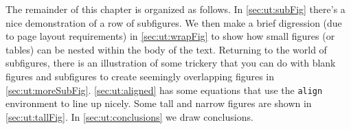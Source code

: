 The remainder of this chapter is organized as follows.
In \autoref{sec:ut:subFig} there's a nice demonstration of a row of subfigures.
We then make a brief digression (due to page layout requirements) in \autoref{sec:ut:wrapFig} to show how small figures (or tables) can be nested within the body of the text.
Returning to the world of subfigures, there is an illustration of some trickery that you can do with blank figures and subfigures to create seemingly overlapping figures in \autoref{sec:ut:moreSubFig}.
\autoref{sec:ut:aligned} has some equations that use the \texttt{align} environment to line up nicely.
Some tall and narrow figures are shown in \autoref{sec:ut:tallFig}.
In \autoref{sec:ut:conclusions} we draw conclusions.
